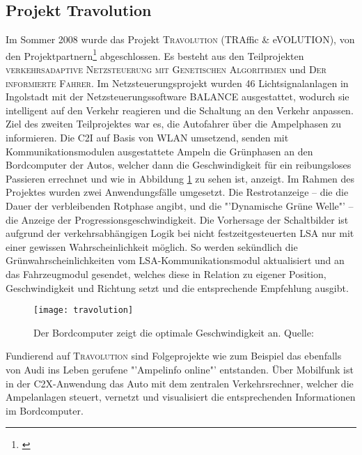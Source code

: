 \subsection*{\label{sec:travolution}Projekt Travolution}
Im Sommer 2008 wurde das Projekt \textsc{Travolution} (TRAffic \& eVOLUTION), von den Projektpartnern\footnote{\cite{Travolution}} abgeschlossen. Es besteht aus den Teilprojekten \textsc{verkehrsadaptive Netzsteuerung mit Genetischen Algorithmen} und \textsc{Der informierte Fahrer}. Im Netzsteuerungsprojekt wurden 46 Lichtsignalanlagen in Ingolstadt mit der Netzsteuerungssoftware BALANCE ausgestattet, wodurch sie intelligent auf den Verkehr reagieren und die Schaltung an den Verkehr anpassen.  Ziel des zweiten Teilprojektes war es, die Autofahrer über die Ampelphasen zu informieren. Die \gls{C2I} auf Basis von \gls{WLAN} umsetzend, senden mit Kommunikationsmodulen ausgestattete Ampeln die Grünphasen an den Bordcomputer der Autos, welcher dann die Geschwindigkeit für ein reibungsloses Passieren errechnet\cite{Stvtechnik} und wie in Abbildung \ref{fig:travolution} zu sehen ist, anzeigt. Im Rahmen des Projektes wurden zwei Anwendungsfälle umgesetzt. Die Restrotanzeige -- die die Dauer der verbleibenden Rotphase angibt, und die "'Dynamische Grüne Welle"' -- die Anzeige der Progressionsgeschwindigkeit.
Die Vorhersage der Schaltbilder ist aufgrund der verkehrsabhängigen Logik bei nicht festzeitgesteuerten \gls{LSA} nur mit einer gewissen Wahrscheinlichkeit möglich. So werden sekündlich die Grünwahrscheinlichkeiten vom \gls{LSA}-Kommunikationsmodul aktualisiert und an das Fahrzeugmodul gesendet, welches diese in Relation zu eigener Position, Geschwindigkeit und Richtung setzt und die entsprechende Empfehlung ausgibt.
\begin{figure}[H]  
    \centering  
    \texttt{[image: travolution]}      
    \caption[Projekt Travolution]{Der Bordcomputer zeigt die optimale Geschwindigkeit an. Quelle: \cite{Travolution}}
    \label{fig:travolution}
\end{figure} 
Fundierend auf \textsc{Travolution} sind Folgeprojekte wie zum Beispiel das ebenfalls von Audi ins Leben gerufene "'Ampelinfo online"' entstanden. Über Mobilfunk ist in der \gls{C2X}-Anwendung das Auto mit dem zentralen Verkehrsrechner, welcher die Ampelanlagen steuert, vernetzt und visualisiert die entsprechenden Informationen im Bordcomputer. \cite{Ampelinfo}
